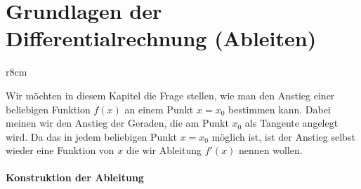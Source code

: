 \thispagestyle{plain}
\section{Grundlagen der Differentialrechnung (Ableiten)}

\begin{wrapfigure}{r}{8cm}
    \centering
    \vspace{-5mm}
    \vspace{-5mm}
\end{wrapfigure}

Wir möchten in diesem Kapitel die Frage stellen, wie man den Anstieg einer beliebigen Funktion $f(x)$ an einem Punkt $x=x_0$ bestimmen kann. Dabei meinen wir den Anstieg der Geraden, die am Punkt $x_0$ als Tangente angelegt wird. Da das in jedem beliebigen Punkt $x=x_0$ möglich ist, ist der Anstieg selbst wieder eine Funktion von $x$ die wir Ableitung $f'(x)$ nennen wollen.

\paragraph{Konstruktion der Ableitung}$~$


